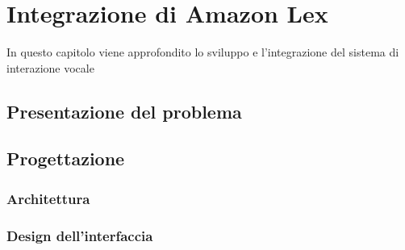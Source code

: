
\chapter{Integrazione di Amazon Lex}
\label{cap:lex}

In questo capitolo viene approfondito lo sviluppo e l'integrazione del sistema di interazione vocale \\


\section{Presentazione del problema}
\section{Progettazione}
	\subsection{Architettura}
	\subsection{Design dell'interfaccia}

